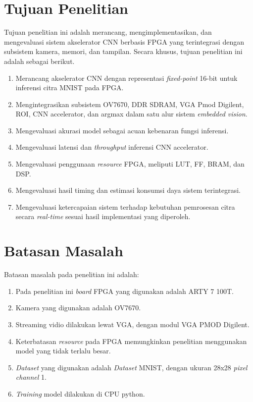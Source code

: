 \section{Tujuan Penelitian}
Tujuan penelitian ini adalah merancang, mengimplementasikan, dan mengevaluasi
sistem akselerator CNN berbasis FPGA yang terintegrasi dengan subsistem kamera,
memori, dan tampilan. Secara khusus, tujuan penelitian ini adalah sebagai
berikut.
\begin{enumerate}
\item Merancang akselerator CNN dengan representasi \emph{fixed-point} 16-bit untuk inferensi citra MNIST pada FPGA.
\item Mengintegrasikan subsistem OV7670, DDR SDRAM, VGA Pmod Digilent, ROI, CNN accelerator, dan argmax dalam satu alur sistem \emph{embedded vision}.
\item Mengevaluasi akurasi model sebagai acuan kebenaran fungsi inferensi.
\item Mengevaluasi latensi dan \emph{throughput} inferensi CNN accelerator.
\item Mengevaluasi penggunaan \emph{resource} FPGA, meliputi LUT, FF, BRAM, dan DSP.
\item Mengevaluasi hasil timing dan estimasi konsumsi daya sistem terintegrasi.
\item Mengevaluasi ketercapaian sistem terhadap kebutuhan pemrosesan citra secara \emph{real-time} sesuai hasil implementasi yang diperoleh.
\end{enumerate}

\section{Batasan Masalah}
Batasan masalah pada penelitian ini adalah:
\begin{enumerate}
\item Pada penelitian ini \emph{board} FPGA yang digunakan adalah ARTY 7 100T.
\item Kamera yang digunakan adalah OV7670.
\item Streaming vidio dilakukan lewat VGA, dengan modul VGA PMOD Digilent.
\item Keterbatasan \emph{resource} pada FPGA memungkinkan penelitian menggunakan model yang tidak terlalu besar.
\item \emph{Dataset} yang digunakan adalah \emph{Dataset} MNIST, dengan ukuran 28x28 \emph{pixel} \emph{channel} 1.
\item \emph{Training} model dilakukan di CPU python.
\end{enumerate}


